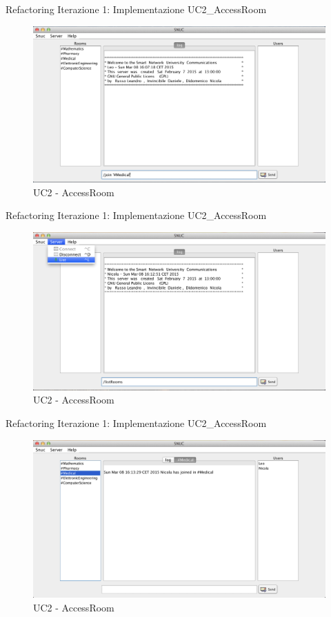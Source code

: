  \begin{frame} {Refactoring Iterazione 1: Implementazione  UC2\_AccessRoom }
   \begin{figure}
    \includegraphics[scale=0.32]{image_implementation/uc2/6.png}{\centering}
    \caption{UC2 - AccessRoom }
   \end{figure}
 \end{frame}

 \begin{frame} {Refactoring Iterazione 1: Implementazione  UC2\_AccessRoom }
   \begin{figure}
    \includegraphics[scale=0.32]{image_implementation/uc2/7.png}{\centering}
    \caption{UC2 - AccessRoom }
   \end{figure}
 \end{frame}

 \begin{frame} {Refactoring Iterazione 1: Implementazione  UC2\_AccessRoom }
   \begin{figure}
    \includegraphics[scale=0.32]{image_implementation/uc2/8.png}{\centering}
    \caption{UC2 - AccessRoom }
   \end{figure}
 \end{frame}

